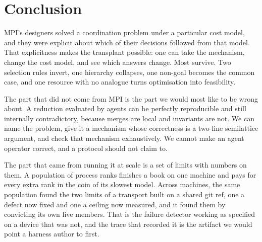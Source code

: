 \documentclass[sigconf,nonacm]{acmart}
\begin{document}
\section{Conclusion}

MPI's designers solved a coordination problem under a particular cost model, and
they were explicit about which of their decisions followed from that model. That
explicitness makes the transplant possible: one can take the mechanism, change
the cost model, and see which answers change. Most survive. Two selection rules
invert, one hierarchy collapses, one non-goal becomes the common case, and one
resource with no analogue turns optimisation into feasibility.

The part that did not come from MPI is the part we would most like to be wrong
about. A reduction evaluated by agents can be perfectly reproducible and still
internally contradictory, because merges are local and invariants are not. We can
name the problem, give it a mechanism whose correctness is a two-line semilattice
argument, and check that mechanism exhaustively. We cannot make an agent operator
correct, and a protocol should not claim to.

The part that came from running it at scale is a set of limits with numbers on
them. A population of process ranks finishes a book on one machine and pays for
every extra rank in the coin of its slowest model. Across machines, the same
population found the two limits of a transport built on a shared git ref, one a
defect now fixed and one a ceiling now measured, and it found them by convicting
its own live members. That is the failure detector working as specified on a
device that was not, and the trace that recorded it is the artifact we would
point a harness author to first.

\balance


\end{document}
